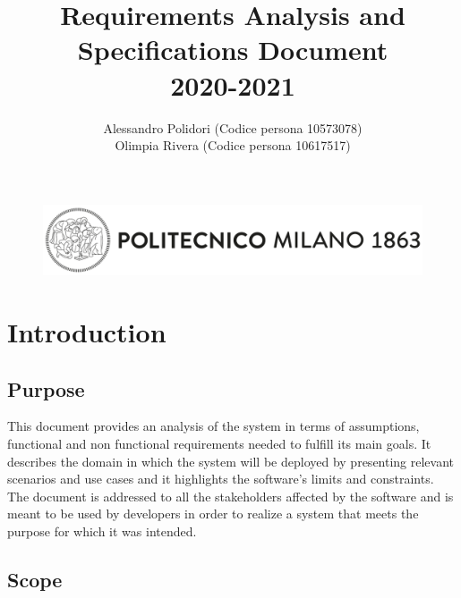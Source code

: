 \documentclass{article}
\title{ Requirements Analysis and Specifications Document\\2020-2021}
\author{Alessandro Polidori (Codice persona 10573078)\\Olimpia Rivera (Codice persona 10617517)}
\date{}
\begin{document}
\begin{figure}[]
  \includegraphics[width=\linewidth]{logo_politecnico.png}
  
\end{figure}
\maketitle
\tableofcontents{}

\newpage

\section{Introduction}

\subsection{Purpose}
This document provides an analysis of the system in terms of assumptions, functional and non functional requirements needed to fulfill its main goals. It describes the domain in which the system will be deployed by presenting relevant scenarios and use cases and it highlights the software’s limits and constraints.
\bigskip\\
The document is addressed to all the stakeholders affected by the software and is meant to be used by developers in order to realize a system that meets the purpose for which it was intended.\\

\subsection{Scope}
\end{document}
